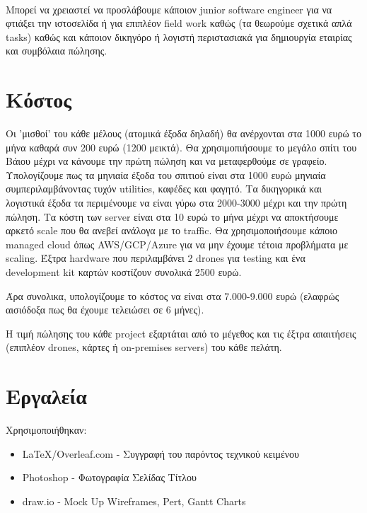 \documentclass{article}
\begin{document}
\\
Μπορεί να χρειαστεί να προσλάβουμε κάποιον junior software engineer για να φτιάξει την ιστοσελίδα ή για επιπλέον field work καθώς (τα θεωρούμε σχετικά απλά tasks) καθώς και κάποιον δικηγόρο ή λογιστή περιστασιακά για δημιουργία εταιρίας και συμβόλαια πώλησης.

\section{Κόστος}

Οι 'μισθοί' του κάθε μέλους (ατομικά έξοδα δηλαδή) θα ανέρχονται στα 1000 ευρώ το μήνα καθαρά συν 200 ευρώ (1200 μεικτά). Θα χρησιμοπιήσουμε το μεγάλο σπίτι του Βάιου μέχρι να κάνουμε την πρώτη πώληση και να μεταφερθούμε σε γραφείο. Υπολογίζουμε πως τα μηνιαία έξοδα του σπιτιού είναι στα 1000 ευρώ μηνιαία συμπεριλαμβάνοντας τυχόν utilities, καφέδες και φαγητό. Τα δικηγορικά και λογιστικά έξοδα τα περιμένουμε να είναι γύρω στα 2000-3000 μέχρι και την πρώτη πώληση. Τα κόστη των server είναι στα 10 ευρώ το μήνα μέχρι να αποκτήσουμε αρκετό scale που θα ανεβεί ανάλογα με το traffic. Θα χρησιμοποιήσουμε κάποιο managed cloud όπως AWS/GCP/Azure για να μην έχουμε τέτοια προβλήματα με scaling. Έξτρα hardware που περιλαμβάνει 2 drones για testing και ένα development kit καρτών κοστίζουν συνολικά 2500 ευρώ.

Άρα συνολικα, υπολογίζουμε το κόστος να είναι στα 7.000-9.000 ευρώ (ελαφρώς αισιόδοξα πως θα έχουμε τελειώσει σε 6 μήνες).

Η τιμή πώλησης του κάθε project εξαρτάται από το μέγεθος και τις έξτρα απαιτήσεις (επιπλέον drones, κάρτες ή on-premises servers) του κάθε πελάτη.

\section{Εργαλεία}
Χρησιμοποιήθηκαν:
\begin{itemize}
    \item \LaTeX/Overleaf.com - Συγγραφή του παρόντος τεχνικού κειμένου
    \item Photoshop - Φωτογραφία Σελίδας Τίτλου
    \item draw.io - Mock Up Wireframes, Pert, Gantt Charts
\end{itemize}
\end{document}
